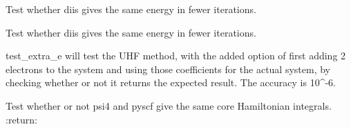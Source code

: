 \documentclass[letterpaper,10pt,english]{sphinxmanual}
\begin{document}
\begin{fulllineitems}
\label{\detokenize{tests:hf.tests.test_auth.test_diis_rhf}}
Test whether diis gives the same energy in fewer iterations.

\end{fulllineitems}


\begin{fulllineitems}
\label{\detokenize{tests:hf.tests.test_auth.test_diis_uhf}}
Test whether diis gives the same energy in fewer iterations.

\end{fulllineitems}


\begin{fulllineitems}
\label{\detokenize{tests:hf.tests.test_auth.test_extra_e}}
test\_extra\_e will test the UHF method, with the added option of first adding 2 electrons to the system and using
those coefficients for the actual system, by checking whether or not it returns the expected result.
The accuracy is 10\textasciicircum{}-6.

\end{fulllineitems}


\begin{fulllineitems}
\label{\detokenize{tests:hf.tests.test_auth.test_one_e}}
Test whether or not psi4 and pyscf give the same core Hamiltonian integrals.
:return:

\end{fulllineitems}

\end{document}
